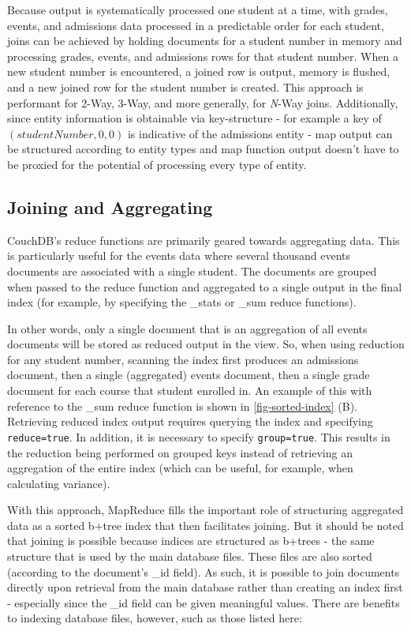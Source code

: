 Because output is systematically processed one student at a time, with grades, events, and admissions data processed in a predictable order for each student, joins can be achieved by holding documents for a student number in memory and processing grades, events, and admissions rows for that student number. When a new student number is encountered, a joined row is output, memory is flushed, and a new joined row for the student number is created. This approach is performant for 2-Way, 3-Way, and more generally, for \textit{N}-Way joins. Additionally, since entity information is obtainable via key-structure - for example a key of $(studentNumber,0,0)$ is indicative of the admissions entity - map output can be structured according to entity types and map function output doesn’t have to be proxied for the potential of processing every type of entity.

\subsection{Joining and Aggregating}
CouchDB's reduce functions are primarily geared towards aggregating data. This is particularly useful for the events data where several thousand events documents are associated with a single student. The documents are grouped when passed to the reduce function and aggregated to a single output in the final index (for example, by specifying the \_stats or \_sum reduce functions).

In other words, only a single document that is an aggregation of all events documents will be stored as reduced output in the view. So, when using reduction for any student number, scanning the index first produces an admissions document, then a single (aggregated) events document, then a single grade document for each course that student enrolled in. An example of this with reference to the \_sum reduce function is shown in \ref{fig-sorted-index} (B). Retrieving reduced index output requires querying the index and specifying \texttt{reduce=true}. In addition, it is necessary to specify \texttt{group=true}. This results in the reduction being performed on grouped keys instead of retrieving an aggregation of the entire index (which can be useful, for example, when calculating variance).



With this approach, MapReduce fills the important role of structuring aggregated data as a sorted b+tree index that then facilitates joining. But it should be noted that joining is possible because indices are structured as b+trees - the same structure that is used by the main database files. These files are also sorted (according to the document’s \_id field). As such, it is possible to join documents directly upon retrieval from the main database rather than creating an index first - especially since the \_id field can be given meaningful values. There are benefits to indexing database files, however, such as those listed here:

